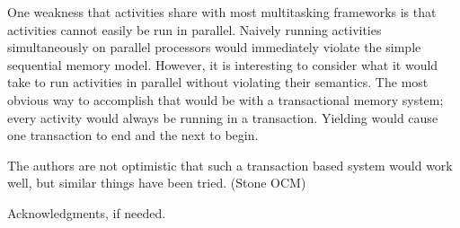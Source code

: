 \documentclass[10pt,preprint]{sigplanconf}
\begin{document}
One weakness that activities share with most multitasking frameworks is that activities cannot easily be run in parallel.
Naively running activities simultaneously on parallel processors would immediately violate the simple sequential memory model.
However, it is interesting to consider what it would take to run activities in parallel without violating their semantics.
The most obvious way to accomplish that would be with a transactional memory system; every activity would always be running in a transaction.
Yielding would cause one transaction to end and the next to begin.

The authors are not optimistic that such a transaction based system would work well, but similar things have been tried. (Stone OCM)

\cite{ONeill2015}

\acks

Acknowledgments, if needed.








\end{document}
